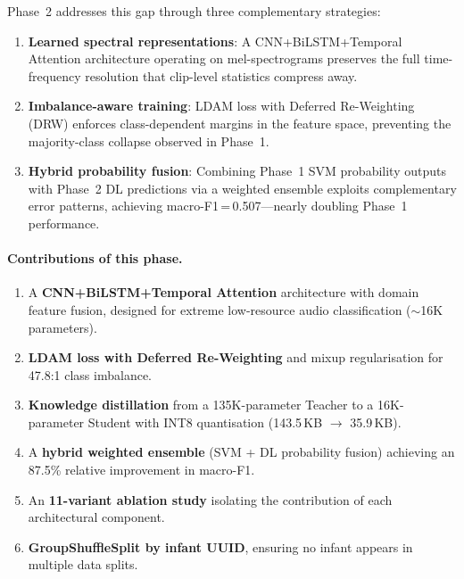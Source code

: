 \documentclass[11pt,a4paper]{article}
\begin{document}
Phase~2 addresses this gap through three complementary strategies:

\begin{enumerate}[nosep]
  \item \textbf{Learned spectral representations}: A CNN+BiLSTM+Temporal
        Attention architecture operating on mel-spectrograms preserves
        the full time-frequency resolution that clip-level statistics
        compress away.
  \item \textbf{Imbalance-aware training}: LDAM loss with Deferred
        Re-Weighting (DRW) enforces class-dependent margins in the
        feature space, preventing the majority-class collapse observed
        in Phase~1.
  \item \textbf{Hybrid probability fusion}: Combining Phase~1 SVM
        probability outputs with Phase~2 DL predictions via a weighted
        ensemble exploits complementary error patterns, achieving
        macro-F1\,=\,0.507---nearly doubling Phase~1 performance.
\end{enumerate}

\paragraph{Contributions of this phase.}
\begin{enumerate}[nosep]
  \item A \textbf{CNN+BiLSTM+Temporal Attention} architecture with
        domain feature fusion, designed for extreme low-resource audio
        classification ($\sim$16K parameters).
  \item \textbf{LDAM loss with Deferred Re-Weighting} and mixup
        regularisation for 47.8:1 class imbalance.
  \item \textbf{Knowledge distillation} from a 135K-parameter Teacher
        to a 16K-parameter Student with INT8 quantisation
        (143.5\,KB $\rightarrow$ 35.9\,KB).
  \item A \textbf{hybrid weighted ensemble} (SVM + DL probability
        fusion) achieving an 87.5\% relative improvement in macro-F1.
  \item An \textbf{11-variant ablation study} isolating the contribution
        of each architectural component.
  \item \textbf{GroupShuffleSplit by infant UUID}, ensuring no infant
        appears in multiple data splits.
\end{enumerate}

\end{document}
